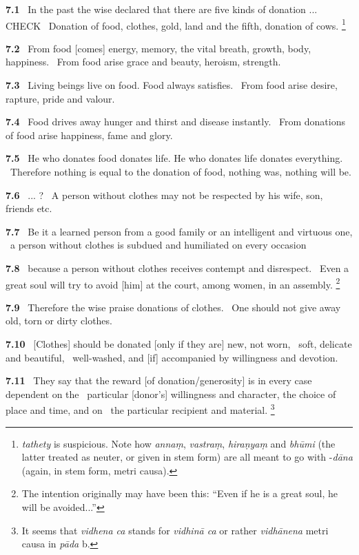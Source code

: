 \documentclass{article}
\newcommand{\skt}[1]{\textit{#1}}
\begin{document}
\textbf{7.1}%
\ In the past the wise declared that there are five kinds of donation ... CHECK%
\ Donation of food, clothes, gold, land and the fifth, donation of cows.%
\footnote{\skt{tathety} is suspicious. Note how \skt{annaṃ}, \skt{vastraṃ}, \skt{hiraṇyaṃ} and \skt{bhūmi} (the latter treated as neuter, or given in                                stem form) are all meant to go with -\skt{dāna} (again, in stem form, metri causa). }%


\textbf{7.2}%
\ From food [comes] energy, memory, the vital breath, growth, body, happiness.%
\ From food arise grace and beauty, heroism, strength.%


\textbf{7.3}%
\ Living beings live on food. Food always satisfies.%
\ From food arise desire, rapture, pride and valour.%


\textbf{7.4}%
\ Food drives away hunger and thirst and disease instantly.%
\ From donations of food arise happiness, fame and glory.%


\textbf{7.5}%
\ He who donates food donates life. He who donates life donates everything.%
\ Therefore nothing is equal to the donation of food, nothing was, nothing will be.%


\textbf{7.6}%
\ ...  ?%
\ A person without clothes may not be respected by his wife, son, friends etc.%


\textbf{7.7}%
\ Be it a learned person from a good family or an intelligent and virtuous one,%
\ a person without clothes is subdued and humiliated on every occasion%


\textbf{7.8}%
\ because a person without clothes receives contempt and disrespect.%
\ Even a great soul will try to avoid [him] at the court, among women, in an assembly.%
\footnote{The intention originally may have been this: ``Even if he is a great soul, he will be avoided...'' }%


\textbf{7.9}%
\ Therefore the wise praise donations of clothes.%
\ One should not give away old, torn or dirty clothes.%


\textbf{7.10}%
\ [Clothes] should be donated [only if they are] new, not worn,%
\                  soft, delicate and beautiful,%
\ well-washed, and [if] accompanied by willingness and devotion.%


\textbf{7.11}%
\ They say that the reward [of donation/generosity] is in every case dependent on the%
\                 particular [donor's] willingness and character, the choice of place and time, and on%
\                 the particular recipient and material.%
\footnote{It seems that \skt{vidhena ca} stands for \skt{vidhinā ca} or rather \skt{vidhānena} metri causa in \skt{pāda} b. }%
\end{document}
